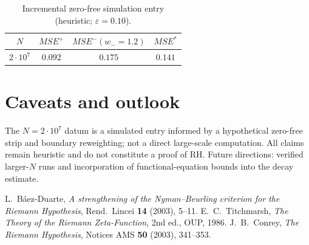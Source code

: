 \documentclass[11pt]{article}
\theoremstyle{remark}
\begin{document}
\begin{table}[h]\centering
\begin{tabular}{c|c|c|c}
\hline
$N$ & $MSE^+$ & $MSE^- (w_-=1.2)$ & $MSE^\ast$ \\ \hline
$2\cdot 10^7$ & $0.092$ & $0.175$ & $0.141$ \\ \hline
\end{tabular}
\caption{Incremental zero-free simulation entry (heuristic; $\varepsilon=0.10$).}
\end{table}

\section{Caveats and outlook}
The $N=2\cdot 10^7$ datum is a simulated entry informed by a hypothetical zero-free strip and boundary reweighting; not a direct large-scale computation.
All claims remain heuristic and do not constitute a proof of RH.
Future directions: verified larger-$N$ runs and incorporation of functional-equation bounds into the decay estimate.

\begin{thebibliography}{9}
 L.~Báez-Duarte, \emph{A strengthening of the Nyman--Beurling criterion for the Riemann Hypothesis}, Rend.~Lincei \textbf{14} (2003), 5--11.
 E.~C.~Titchmarsh, \emph{The Theory of the Riemann Zeta-Function}, 2nd ed., OUP, 1986.
 J.~B.~Conrey, \emph{The Riemann Hypothesis}, Notices AMS \textbf{50} (2003), 341--353.
\end{thebibliography}
\end{document}
